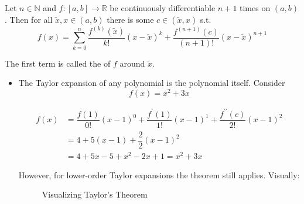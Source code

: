 \documentclass{article}
\begin{document}
\begin{theorem}
  Let $n \in \mathbb{N}$ and $f: [a, b] \to \mathbb{R}$ be continuously differentiable $n + 1$ times on $(a, b)$. Then for all $\widetilde{x}, x \in (a, b)$ there is some $c \in (\widetilde{x}, x)$ s.t.
  \[
    f(x)
    = \sum^{n}_{k = 0} \dfrac{f^{(k)}(\widetilde{x})}{k!} (x - \widetilde{x})^k
    + \dfrac{f^{(n + 1)}(c)}{(n + 1)!} (x - \widetilde{x})^{n + 1}
  \]

  The first term is called the  of $f$ around $\widetilde{x}$.
\end{theorem}

\begin{example}
  \begin{itemize}[label=$\bullet$]
    \item The Taylor expansion of any polynomial is the polynomial itself. Consider
      \[
        f(x) = x^2 + 3x
      \]

      \begin{align*}
        f(x)
        & =
        \dfrac{f(1)}{0!} (x - 1)^0
        +
        \dfrac{f^\prime(1)}{1!} (x - 1)^1
        +
        \dfrac{f^{\prime\prime}(c)}{2!} (x - 1)^2
        \\
        & =
        4
        +
        5 (x - 1)
        +
        \dfrac{2}{2} (x - 1)^2
        \\
        & =
        4 + 5x - 5 + x^2 - 2x + 1
        =
        x^2 + 3x
      \end{align*}

      However, for lower-order Taylor expansions the theorem still applies. Visually:
      \begin{figure}[H]
        \centering
        \caption{Visualizing Taylor's Theorem}
        \label{fig:visualizing_taylor_s_theorem}
\end{figure}
\end{itemize}
\end{example}
\end{document}
